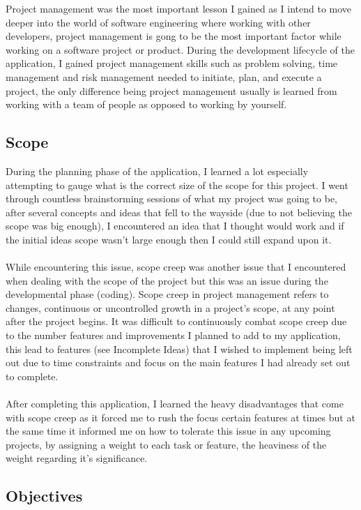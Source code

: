 Project management was the most important lesson I gained as I intend to move deeper into the world of software engineering where working with other developers, project management is gong to be the most important factor while working on a software project or product. During the development lifecycle of the application, I gained project management skills such as problem solving, time management and risk management needed to initiate, plan, and execute a project, the only difference being project management usually is learned from working with a team of people as opposed to working by yourself.

\subsection{Scope}

During the planning phase of the application, I learned a lot especially attempting to gauge what is the correct size of the scope for this project. I went through countless brainstorming sessions of what my project was going to be, after several concepts and ideas that fell to the wayside (due to not believing the scope was big enough), I encountered an idea that I thought would work and if the initial ideas scope wasn't large enough then I could still expand upon it. \\ \\
While encountering this issue, scope creep was another issue that I encountered when dealing with the scope of the project but this was an issue during the developmental phase (coding). Scope creep in project management refers to changes, continuous or uncontrolled growth in a project’s scope, at any point after the project begins. It was difficult to continuously combat scope creep due to the number features and improvements I planned to add to my application, this lead to features (see Incomplete Ideas) that I wished to implement being left out due to time constraints and focus on the main features I had already set out to complete.\\ \\
After completing this application, I learned the heavy disadvantages that come with scope creep as it forced me to rush the focus certain features at times but at the same time it informed me on how to tolerate this issue in any upcoming projects, by assigning a weight to each task or feature, the heaviness of the weight regarding it's significance.

\subsection{Objectives}

